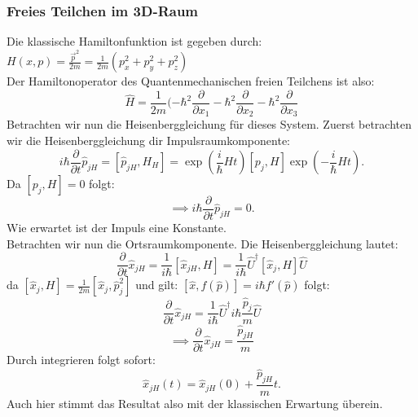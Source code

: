 \documentclass{report}
\begin{document}
\subsubsection{Freies Teilchen im 3D-Raum}
Die klassische Hamiltonfunktion ist gegeben durch:\\
$H(x,p) = \frac{\vec{p}^2}{2m} = \frac{1}{2m} (p_x^2 + p_y^2 + p_z^2)$ \\
Der Hamiltonoperator des Quantenmechanischen freien Teilchens ist also: \[
	\hat{H} = \frac{1}{2m} (-\hbar^2 \frac{\partial}{\partial x_1} - \hbar^2 \frac{\partial}{\partial x_2} - \hbar^2 \frac{\partial}{\partial x_3}
\] Betrachten wir nun die Heisenberggleichung für dieses System. Zuerst betrachten wir die Heisenberggleichung dir Impulsraumkomponente: \[
i\hbar \frac{\partial}{\partial t} \hat{p}_{jH} = [\hat{p}_{jH}, H_H] = \exp(\frac{i}{\hbar } H t) [p_j, H] \exp(-\frac{i}{\hbar } H t)
.\]  Da $[p_j, H] = 0$ folgt: \[
\implies i \hbar \frac{\partial}{\partial t} \hat{p}_{jH} =  0
.\] Wie erwartet ist der Impuls eine Konstante.\\
Betrachten wir nun die Ortsraumkomponente. Die Heisenberggleichung lautet: \[
	\frac{\partial}{\partial t} \hat{x}_{jH} = \frac{1}{i \hbar} [\hat{x}_{jH}, H] = \frac{1}{i\hbar } \hat{U}^\dagger [\hat{x}_j, H] \hat{U}
\] da $[\hat{x}_j, H] = \frac{1}{2m} [\hat{x}_j, \hat{p}_j^2]$ und gilt: $[\hat{x}, f(\hat{p})] = i\hbar f'(\hat{p})$ folgt: \[
\frac{\partial}{\partial t} \hat{x}_{jH} = \frac{1}{i\hbar} \hat{U}^\dagger i \hbar \frac{\hat{p}_j}{m} \hat{U}
\] \[
\implies \frac{\partial}{\partial t} \hat{x}_{jH} = \frac{\hat{p}_{jH}}{m}
\] Durch integrieren folgt sofort: \[
\hat{x}_{jH}(t) = \hat{x}_{jH}(0) + \frac{\hat{p}_{jH}}{m}t
.\]   Auch hier stimmt das Resultat also mit der klassischen Erwartung überein.
\end{document}
